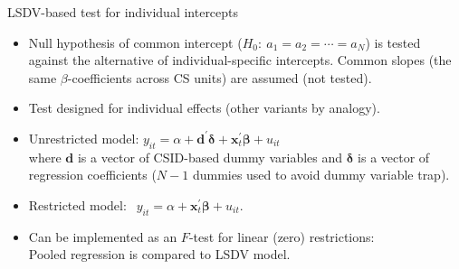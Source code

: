 \documentclass[usenames,dvipsnames]{beamer}
\begin{document}
\begin{frame}{LSDV-based test for individual intercepts}
\small
\begin{itemize}
    \item Null hypothesis of common  intercept ($H_0:~a_1 = a_2 = \cdots = a_N$) is tested against the alternative of individual-specific intercepts. Common slopes (the same $\beta$-coefficients across CS units) are assumed (not tested).
    \medskip
    \item Test designed for individual effects (other variants by analogy).
    \medskip
    \item Unrestricted model: $y_{it} = \alpha + \bm{d}^{\prime}\bm{\delta} + \bm{x}_t^{\prime} \bm{\beta} + u_{it}$ \\ \medskip
    where $\bm{d}$ is a vector of CSID-based dummy variables and $\bm{\delta}$ is a vector of regression coefficients ($N-1$ dummies used to avoid dummy variable trap).
    \medskip
    \item Restricted model: $~~y_{it} = \alpha + \bm{x}_t^{\prime} \bm{\beta} + u_{it}$.
    \medskip
    \item Can be implemented as an $F$-test for linear (zero) restrictions: \\Pooled regression is compared to LSDV model.
\end{itemize}
\end{frame}
\end{document}
